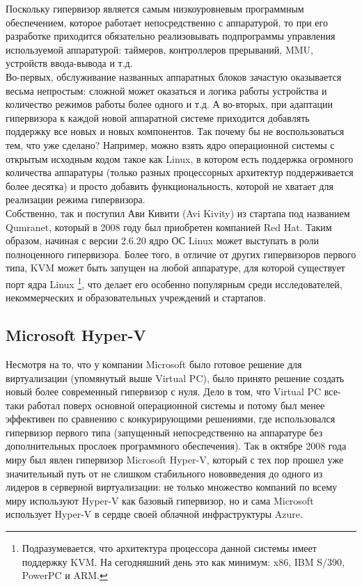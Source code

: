 \documentclass[14pt, a4paper]{article}
\begin{document}
Поскольку гипервизор является самым низкоуровневым программным обеспечением,
которое работает непосредственно с аппаратурой, то при его разработке приходится
обязательно реализовывать подпрограммы управления используемой аппаратурой:
таймеров, контроллеров прерываний, MMU, устройств ввода-вывода и т.д.\\


Во-первых, обслуживание названных аппаратных блоков зачастую оказывается весьма
непростым: сложной может оказаться и логика работы устройства и количество
режимов работы более одного и т.д. А во-вторых, при адаптации гипервизора к каждой 
новой аппаратной системе приходится добавлять поддержку все новых и новых
компонентов. Так почему бы не воспользоваться тем, что уже сделано? Например,
можно взять ядро операционной системы с открытым исходным кодом такое как Linux,
в котором есть поддержка огромного количества аппаратуры (только разных
процессорных архитектур поддерживается более десятка) и просто добавить
функциональность, которой не хватает для реализации режима гипервизора.\\

Собственно, так и поступил Ави Кивити (Avi Kivity) из стартапа под названием
Qumranet, который в 2008 году был приобретен компанией Red Hat. Таким образом,
начиная с версии 2.6.20 ядро ОС Linux может выступать в роли полноценного
гипервизора. Более того, в отличие от других гипервизоров первого типа, KVM может
быть запущен на любой аппаратуре, для которой существует порт ядра Linux \footnote{Подразумевается, что архитектура процессора данной системы имеет поддержку KVM. На
сегодняшний день это как минимум: x86, IBM S/390, PowerPC и ARM.}, что
делает его особенно популярным среди исследователей, некоммерческих и
образовательных учреждений и стартапов.\\

\subsection*{Microsoft Hyper-V}

Несмотря на то, что у компании Microsoft было готовое решение для виртуализации
(упомянутый выше Virtual PC), было принято решение создать новый более
современный гипервизор с нуля. Дело в том, что Virtual PC все-таки работал поверх
основной операционной системы и потому был менее эффективен по сравнению с
конкурирующими решениями, где использовался гипервизор первого типа
(запущенный непосредственно на аппаратуре без дополнительных прослоек
программного обеспечения). Так в октябре 2008 года миру был явлен гипервизор
Microsoft Hyper-V, который с тех пор прошел уже значительный путь от не слишком
стабильного нововведения до одного из лидеров в серверной виртуализации: не
только множество компаний по всему миру используют Hyper-V как базовый
гипервизор, но и сама Microsoft использует Hyper-V в сердце своей облачной
инфраструктуры Azure.\\
\end{document}
